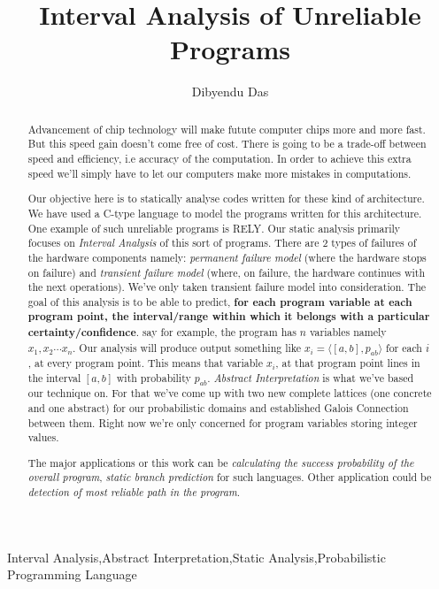 \documentclass[final,3p, review, times]{util/elsarticle}
\begin{document}
\begin{frontmatter}

\title{Interval Analysis of Unreliable Programs}

\author[iitkgp]{Dibyendu Das}


\address[iitkgp]{Department of Computer Science \& Engineering, IIT Kharagpur, West Bengal 721302, India}

\begin{abstract}
Advancement of chip technology will make futute computer chips more and more fast. But this speed gain doesn't come free of cost. There is going to be a trade-off between speed and efficiency, i.e accuracy of the computation. In order to achieve this extra speed we'll simply have to let our computers make more mistakes in computations.

Our objective here is to statically analyse codes written for these kind of architecture. We have used a C-type language to model the programs written for this architecture. One example of such unreliable programs is RELY\cite{carbin13}. Our static analysis primarily focuses on \textit{Interval Analysis} of this sort of programs.  There are 2 types of failures of the hardware components namely: \emph{permanent failure model} (where the hardware stops on failure) and \emph{transient failure model} (where, on failure, the hardware continues with the next operations). We've only taken transient failure model into consideration. The goal of this analysis is to be able to predict, \textbf{for each program variable at each program point, the interval/range within which it belongs with a particular certainty/confidence}. say for example, the program has $n$ variables namely $x_1,x_2\cdots x_n$. Our analysis will produce output something like $x_i=\langle[a,b],p_{ab}\rangle$ for each $i$, at every program point. This means that variable $x_i$, at that program point lines in the interval $[a,b]$ with probability $p_{ab}$. \emph{Abstract Interpretation} is what we've based our technique on. For that we've come up with two new complete lattices (one concrete and one abstract) for our probabilistic domains and established Galois Connection between them. Right now we're only concerned for program variables storing integer values.

The major applications or this work can be \emph{calculating the success probability of the overall program}, \emph{static branch prediction} for such languages. Other application could be \emph{detection of most reliable path in the program}.
\end{abstract}

\begin{keyword}
Interval Analysis\sep Abstract Interpretation\sep Static Analysis\sep Probabilistic Programming Language
\end{keyword}

\end{frontmatter}
\end{document}
